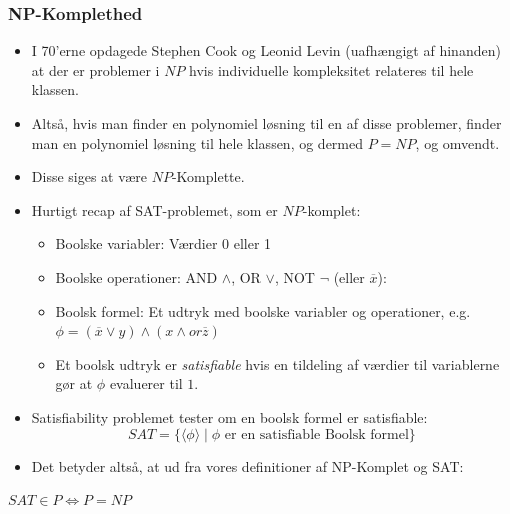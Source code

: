\begin{frame}[allowframebreaks]
	\frametitle{NP-Komplethed}
	\begin{itemize}
		\item I 70'erne opdagede Stephen Cook og Leonid Levin (uafhængigt af hinanden) at der er problemer i $NP$ hvis individuelle kompleksitet relateres til hele klassen.
		\item Altså, hvis man finder en polynomiel løsning til en af disse problemer, finder man en polynomiel løsning til hele klassen, og dermed $P = NP$, og omvendt.
		\item Disse siges at være $NP$-Komplette.
		\item Hurtigt recap af SAT-problemet, som er $NP$-komplet:
		      \begin{itemize}
			      \item Boolske variabler: Værdier 0 eller 1
			      \item Boolske operationer: AND $\land$, OR $\lor$, NOT $\neg$ (eller $\overline{x}$):
			      \item Boolsk formel: Et udtryk med boolske variabler og operationer, e.g. $\phi = (\overline{x} \lor y) \land (x \land or \overline{z})$
			      \item Et boolsk udtryk er \textit{satisfiable} hvis en tildeling af værdier til variablerne gør at $\phi$ evaluerer til $1$.
		      \end{itemize}

		\item Satisfiability problemet tester om en boolsk formel er satisfiable:
		      \begin{equation*}
			      SAT = \{\langle \phi \rangle \mid \phi \text{ er en satisfiable Boolsk formel}\}
		      \end{equation*}
		\item Det betyder altså, at ud fra vores definitioner af NP-Komplet og SAT:
	\end{itemize}
	\begin{theorem}
		$SAT \in P \iff P = NP$
	\end{theorem}
\end{frame}

